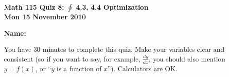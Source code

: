 \documentclass[11pt,letterpaper]{article}
\begin{document}
\flushleft
\begin{multicols}{2}


\begin{large}\textbf{Math 115 Quiz 8: $\oint $ 4.3, 4.4 Optimization \\
Mon 15 November 2010}\end{large}

\textbf{Name:  }\underline{\hspace{35ex}}

\vspace{.5in}

\end{multicols}

\pagestyle{empty}

\flushleft

You have 30 minutes to complete this quiz.  Make your variables clear and
consistent (so if you want to say, for example, $\frac{dy}{dx}$, you should also
mention $y=f(x)$, or ``$y$ is a function of $x$'').  Calculators are OK.  
\end{document}
